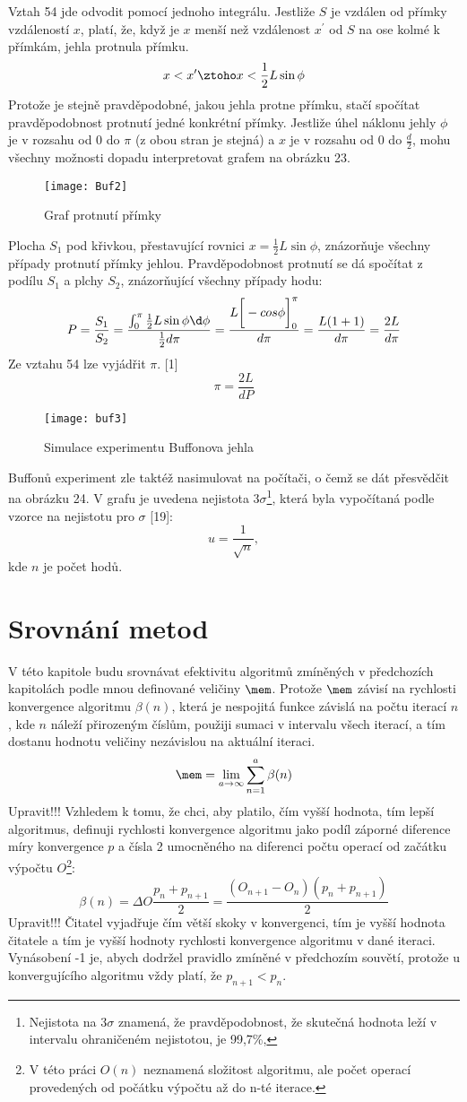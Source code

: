 \documentclass[soc]{gzwroc} %
\begin{document}
Vztah 54 jde odvodit pomocí jednoho integrálu. Jestliže $S$ je vzdálen od přímky vzdáleností $x$, platí, že, když je $x$ menší než vzdálenost $x^\prime$ od $S$ na ose kolmé k přímkám, jehla protnula přímku.
$$
x<x^\prime \ztoho x<\frac{1}{2}L\sin\phi
$$
Protože je stejně pravděpodobné, jakou jehla protne přímku, stačí spočítat pravděpodobnost protnutí jedné konkrétní přímky. Jestliže úhel náklonu jehly $\phi$ je v rozsahu od 0 do $\pi$ (z obou stran je stejná) a $x$ je v rozsahu od 0 do $\frac{d}{2}$, mohu všechny možnosti dopadu interpretovat grafem na obrázku 23.
\begin{figure}[!ht]
\texttt{[image: Buf2]}
\caption{Graf protnutí přímky}
\label{fig:kruh}
\end{figure}
Plocha $S_1$ pod křivkou, přestavující rovnici $x=\frac{1}{2}L\sin\phi$, znázorňuje všechny případy protnutí přímky jehlou. Pravděpodobnost protnutí se dá spočítat z podílu $S_1$ a plchy $S_2$, znázorňující všechny případy hodu:
$$
P=\frac{S_1}{S_2}=\frac{\int_0^\pi \frac{1}{2}L\sin \phi \d \phi}{\frac{1}{2}d\pi}=\frac{L\bigg[-cos \phi \bigg]^\pi_0}{d\pi}=\frac{L(1+1)}{d\pi}=\frac{2L}{d\pi}
$$
Ze vztahu 54 lze vyjádřit $\pi$. [1]
\begin{equation}
\pi=\frac{2L}{dP}
\end{equation}
\begin{figure}[!ht]
\texttt{[image: buf3]}
\caption{Simulace experimentu Buffonova jehla}
\label{fig:graf1}
\end{figure}
Buffonů experiment zle taktéž nasimulovat na počítači, o čemž se dát přesvědčit na obrázku 24. V grafu je uvedena nejistota $3\sigma$\footnote[11]{Nejistota na $3\sigma$ znamená, že pravděpodobnost, že skutečná hodnota leží v intervalu ohraničeném nejistotou, je 99,7\%,}, která byla vypočítaná podle vzorce na nejistotu pro $\sigma$ [19]:
$$
u=\frac{1}{\sqrt{n}},
$$
kde $n$ je počet hodů.
\section{Srovnání metod}
V této kapitole budu srovnávat efektivitu algoritmů zmíněných v předchozích kapitolách podle mnou definované veličiny $\mem$. Protože $\mem$ závisí na rychlosti konvergence algoritmu $\beta(n)$, která je nespojitá funkce závislá na počtu iterací $n$, kde $n$ náleží přirozeným číslům, použiji sumaci v intervalu všech iterací, a tím dostanu hodnotu veličiny nezávislou na aktuální iteraci.
$$
\mem=\lim_{a\to\infty} \sum_{n=1}^{a}\beta(n)
$$
Upravit!!!
Vzhledem k tomu, že chci, aby platilo, čím vyšší hodnota, tím lepší algoritmus, definuji rychlosti konvergence algoritmu jako podíl záporné diference míry konvergence $p$ a čísla 2 umocněného na diferenci počtu operací od začátku výpočtu $O$\footnote[12]{V této práci $O(n)$ neznamená složitost algoritmu, ale počet operací provedených od počátku výpočtu až do n-té iterace.}:
$$
\beta(n)=\Delta O\frac{p_n+p_{n+1}}{2}=\frac{(O_{n+1}-O_n)(p_n+p_{n+1})}{2}
$$
Upravit!!!
Čitatel vyjadřuje čím větší skoky v konvergenci, tím je vyšší hodnota čitatele a tím je vyšší hodnoty rychlosti konvergence algoritmu v dané iteraci. Vynásobení -1 je, abych dodržel pravidlo zmíněné v předchozím souvětí, protože u konvergujícího algoritmu vždy platí, že $p_{n+1}<p_n$.
\end{document}
